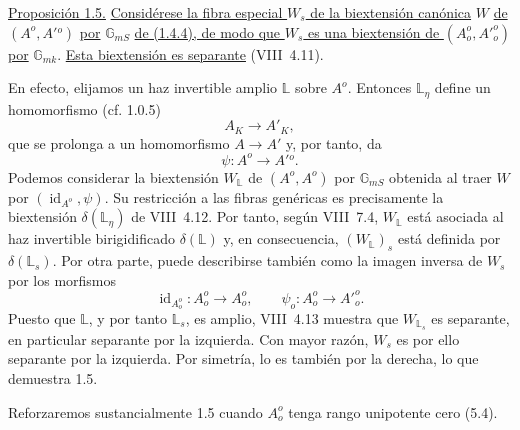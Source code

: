 \medskip
\noindent
\underline{Proposición 1.5.} \underline{Considérese la fibra especial
$W_s$ de la biextensión canónica} $W$ \underline{de}
$(A^o,A'{}^o)$ \underline{por} $\mathbb G_{mS}$ \underline{de (1.4.4),
de modo que $W_s$ es una biextensión de $(A_o^o,{A'}_o^o)$ por}
$\mathbb G_{mk}$. \underline{Esta biextensión es separante}
(VIII~4.11).

En efecto, elijamos un haz invertible amplio $\mathbb L$ sobre $A^o$.
Entonces $\mathbb L_\eta$ define un homomorfismo (cf. 1.0.5)
\[
 A_K\longrightarrow A'_K,
\]
que se prolonga a un homomorfismo $A\longrightarrow A'$ y, por tanto,
da
\[
 \psi:A^o\longrightarrow A'{}^o.
\]
Podemos considerar la biextensión $W_{\mathbb L}$ de $(A^o,A^o)$ por
$\mathbb G_{mS}$ obtenida al traer $W$ por
$(\operatorname{id}_{A^o},\psi)$. Su restricción a las fibras genéricas
es precisamente la biextensión $\delta(\mathbb L_\eta)$ de VIII~4.12.
Por tanto, según VIII~7.4, $W_{\mathbb L}$ está asociada al haz
invertible birigidificado $\delta(\mathbb L)$ y, en consecuencia,
$(W_{\mathbb L})_s$ está definida por $\delta(\mathbb L_s)$. Por otra
parte, puede describirse también como la imagen inversa de $W_s$ por
los morfismos
\[
 \operatorname{id}_{A_o^o}:A_o^o\longrightarrow A_o^o,
 \qquad
 \psi_o:A_o^o\longrightarrow {A'}_o^o.
\]
Puesto que $\mathbb L$, y por tanto $\mathbb L_s$, es amplio,
VIII~4.13 muestra que $W_{\mathbb L_s}$ es separante, en particular
separante por la izquierda. Con mayor razón, $W_s$ es por ello
separante por la izquierda. Por simetría, lo es también por la derecha,
lo que demuestra 1.5.

Reforzaremos sustancialmente 1.5 cuando $A_o^o$ tenga rango unipotente
cero (5.4).
